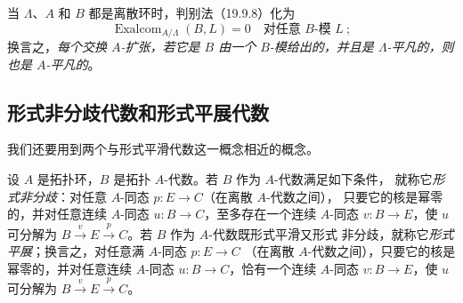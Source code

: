当 $\Lambda$、$A$ 和 $B$ 都是离散环时，判别法（19.9.8）化为
\begin{equation}
\tag{19.9.8.1}
\label{0.19.9.8.1-fr}
  \operatorname{Exalcom}_{A/\Lambda}(B,L)=0
  \quad\text{对任意 $B$-模 $L$}~;
\end{equation}
换言之，\emph{每个交换 $A$-扩张，若它是 $B$ 由一个 $B$-模给出的，并且是
$\Lambda$-平凡的，则也是 $A$-平凡的}。

\subsection{形式非分歧代数和形式平展代数}
\label{subsection:0.19.10-fr}
\label{0.19.10-fr}

\begin{env}[19.10.1]
\label{0.19.10.1-fr}
我们还要用到两个与形式平滑代数这一概念相近的概念。
\end{env}

\begin{definition}[19.10.2]
\label{0.19.10.2-fr}
设 $A$ 是拓扑环，$B$ 是拓扑 $A$-代数。若 $B$ 作为 $A$-代数满足如下条件，
就称它\emph{形式非分歧}：对任意 $A$-同态 $p:E\to C$（在离散 $A$-代数之间），
只要它的核是幂零的，并对任意连续 $A$-同态 $u:B\to C$，至多存在一个连续
$A$-同态 $v:B\to E$，使 $u$ 可分解为
$B\xrightarrow{v}E\xrightarrow{p}C$。若 $B$ 作为 $A$-代数既形式平滑又形式
非分歧，就称它\emph{形式平展}；换言之，对任意满 $A$-同态 $p:E\to C$
（在离散 $A$-代数之间），只要它的核是幂零的，并对任意连续 $A$-同态
$u:B\to C$，恰有一个连续 $A$-同态
$v:B\to E$，使 $u$ 可分解为 $B\xrightarrow{v}E\xrightarrow{p}C$。
\end{definition}


